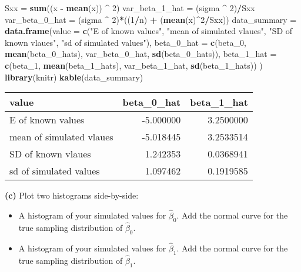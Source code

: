 \documentclass[
]{article}
\newenvironment{Shaded}{\begin{snugshade}}{\end{snugshade}}
\newcommand{\DataTypeTok}[1]{\textcolor[rgb]{0.13,0.29,0.53}{#1}}
\newcommand{\DecValTok}[1]{\textcolor[rgb]{0.00,0.00,0.81}{#1}}
\newcommand{\KeywordTok}[1]{\textcolor[rgb]{0.13,0.29,0.53}{\textbf{#1}}}
\newcommand{\NormalTok}[1]{#1}
\newcommand{\OperatorTok}[1]{\textcolor[rgb]{0.81,0.36,0.00}{\textbf{#1}}}
\newcommand{\StringTok}[1]{\textcolor[rgb]{0.31,0.60,0.02}{#1}}
\providecommand{\tightlist}{%
  \setlength{\itemsep}{0pt}\setlength{\parskip}{0pt}}
\begin{document}
\begin{Shaded}
\begin{Highlighting}[]
\NormalTok{Sxx =}\StringTok{ }\KeywordTok{sum}\NormalTok{((x }\OperatorTok{-}\StringTok{ }\KeywordTok{mean}\NormalTok{(x)) }\OperatorTok{^}\StringTok{ }\DecValTok{2}\NormalTok{)}
\NormalTok{var_beta_}\DecValTok{1}\NormalTok{_hat =}\StringTok{ }\NormalTok{(sigma }\OperatorTok{^}\StringTok{ }\DecValTok{2}\NormalTok{)}\OperatorTok{/}\NormalTok{Sxx}
\NormalTok{var_beta_}\DecValTok{0}\NormalTok{_hat =}\StringTok{ }\NormalTok{(sigma }\OperatorTok{^}\StringTok{ }\DecValTok{2}\NormalTok{)}\OperatorTok{*}\NormalTok{((}\DecValTok{1}\OperatorTok{/}\NormalTok{n) }\OperatorTok{+}\StringTok{ }\NormalTok{(}\KeywordTok{mean}\NormalTok{(x)}\OperatorTok{^}\DecValTok{2}\OperatorTok{/}\NormalTok{Sxx))}
\NormalTok{data_summary =}\StringTok{ }\KeywordTok{data.frame}\NormalTok{(}\DataTypeTok{value =} \KeywordTok{c}\NormalTok{(}\StringTok{"E of known values"}\NormalTok{, }\StringTok{"mean of simulated vlaues"}\NormalTok{, }\StringTok{"SD of known vlaues"}\NormalTok{, }\StringTok{"sd of simulated values"}\NormalTok{),}
                          \DataTypeTok{beta_0_hat =} \KeywordTok{c}\NormalTok{(beta_}\DecValTok{0}\NormalTok{, }\KeywordTok{mean}\NormalTok{(beta_}\DecValTok{0}\NormalTok{_hats), var_beta_}\DecValTok{0}\NormalTok{_hat, }\KeywordTok{sd}\NormalTok{(beta_}\DecValTok{0}\NormalTok{_hats)),}
                          \DataTypeTok{beta_1_hat =} \KeywordTok{c}\NormalTok{(beta_}\DecValTok{1}\NormalTok{, }\KeywordTok{mean}\NormalTok{(beta_}\DecValTok{1}\NormalTok{_hats), var_beta_}\DecValTok{1}\NormalTok{_hat, }\KeywordTok{sd}\NormalTok{(beta_}\DecValTok{1}\NormalTok{_hats))}
\NormalTok{                          )}
\KeywordTok{library}\NormalTok{(knitr)}
\KeywordTok{kable}\NormalTok{(data_summary)}
\end{Highlighting}
\end{Shaded}

\begin{longtable}[]{@{}lrr@{}}
\toprule
value & beta\_0\_hat & beta\_1\_hat\tabularnewline
\midrule
\endhead
E of known values & -5.000000 & 3.2500000\tabularnewline
mean of simulated vlaues & -5.018445 & 3.2533514\tabularnewline
SD of known vlaues & 1.242353 & 0.0368941\tabularnewline
sd of simulated values & 1.097462 & 0.1919585\tabularnewline
\bottomrule
\end{longtable}

\textbf{(c)} Plot two histograms side-by-side:

\begin{itemize}
\tightlist
\item
  A histogram of your simulated values for \(\hat{\beta}_0\). Add the
  normal curve for the true sampling distribution of \(\hat{\beta}_0\).
\item
  A histogram of your simulated values for \(\hat{\beta}_1\). Add the
  normal curve for the true sampling distribution of \(\hat{\beta}_1\).
\end{itemize}
\end{document}

